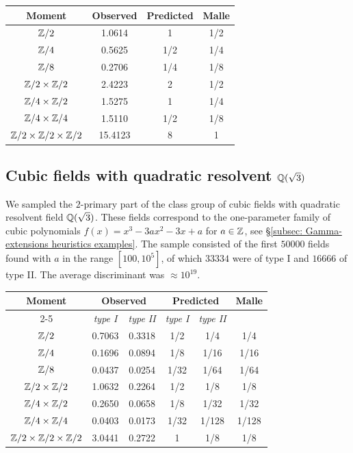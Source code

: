 \documentclass[11pt,a4paper]{amsart}
\def\Z{{\rm \mathbb{Z}}}
\def\Q{{\rm \mathbb{Q}}}
\numberwithin{equation}{section}
\begin{document}
\begin{center}
\begin{tabular}{|c|c|c|c|}\hline
\textbf{Moment} & \textbf{Observed} & \textbf{Predicted} & \textbf{Malle} \\ \hline
$\Z/2$ & 1.0614 & \cellcolor{lightgray} 1 & 1/2 \\ \hline 
$\Z/4$ & 0.5625 & 1/2  & 1/4 \\ \hline
$\Z/8$ & 0.2706 & 1/4 & 1/8 \\ \hline
$\Z/2 \times \Z/2$ & 2.4223  & \cellcolor{lightgray} 2 & 1/2 \\ \hline
$\Z/4 \times \Z/2$ & 1.5275 & 1  & 1/4 \\ \hline
$\Z/4 \times \Z/4$ & 1.5110 & 1/2 & 1/8 \\ \hline
$\Z/2 \times \Z/2 \times \Z/2$ & 15.4123 & \cellcolor{lightgray} 8 & 1 \\ \hline
\end{tabular}
\end{center}


\subsection{Cubic fields with quadratic resolvent $\Q(\sqrt{3})$} \label{tbl: cubic field with quadratic resolvent Q(sqrt(3))} We sampled the $2$-primary part of the class group of cubic fields with quadratic resolvent field $\Q(\sqrt{3})$. These fields correspond to the one-parameter family of cubic polynomials $f(x) = x^3 - 3ax^2-3x+a$ for $a \in \Z$, see \S \ref{subsec: Gamma-extensions heuristics examples}. The sample consisted of the first $50000$ fields found with $a$ in the range $[100,10^5]$, of which $33334$ were of type I and $16666$ of type II. The average discriminant was $\approx 10^{19}$. \\

\begin{center}
\begin{tabular}{|c|c||c|c||c|c|}\hline
\multirow{2}{*}{\textbf{Moment}} & \multicolumn{2}{c|}{\textbf{Observed}} & \multicolumn{2}{c|}{\textbf{Predicted}} & \multirow{2}{*}{\textbf{Malle}} \\ \cline{2-5}
& \textit{type I} & \textit{type II} & \textit{type I} & \textit{type II} &  \\ \hline
$\Z/2$ & 0.7063 & 0.3318 & \cellcolor{lightgray} 1/2 &  1/4 & 1/4 \\ \hline 
$\Z/4$ & 0.1696 & 0.0894 & 1/8 & 1/16 & 1/16 \\ \hline
$\Z/8$ & 0.0437 & 0.0254 & 1/32 & 1/64 & 1/64 \\ \hline
$\Z/2 \times \Z/2$ & 1.0632 & 0.2264 & \cellcolor{lightgray} 1/2 & 1/8 & 1/8 \\ \hline
$\Z/4 \times \Z/2$ & 0.2650 & 0.0658 & 1/8  & 1/32 & 1/32 \\ \hline
$\Z/4 \times \Z/4$ & 0.0403 & 0.0173 & 1/32 & 1/128 & 1/128 \\ \hline
$\Z/2 \times \Z/2 \times \Z/2$ & 3.0441 & 0.2722 & \cellcolor{lightgray} 1 &  1/8 & 1/8 \\ \hline
\end{tabular}
\end{center}
\end{document}
